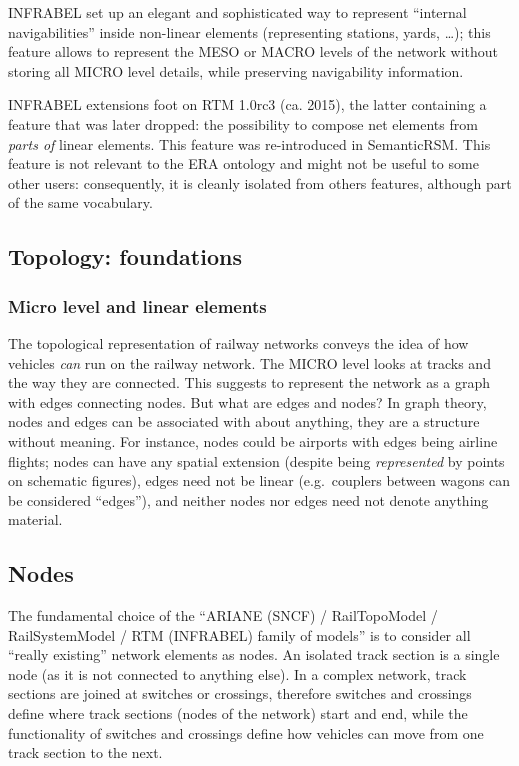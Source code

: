 \documentclass[
  11pt,
]{article}
\begin{document}
INFRABEL set up an elegant and sophisticated way to represent ``internal
navigabilities'' inside non-linear elements (representing stations,
yards, \ldots); this feature allows to represent the MESO or MACRO
levels of the network without storing all MICRO level details, while
preserving navigability information.

INFRABEL extensions foot on RTM 1.0rc3 (ca. 2015), the latter containing
a feature that was later dropped: the possibility to compose net
elements from \emph{parts of} linear elements. This feature was
re-introduced in SemanticRSM. This feature is not relevant to the ERA
ontology and might not be useful to some other users: consequently, it
is cleanly isolated from others features, although part of the same
vocabulary.

\hypertarget{topology-foundations}{%
\subsection{Topology: foundations}\label{topology-foundations}}

\hypertarget{micro-level-and-linear-elements}{%
\subsubsection{Micro level and linear
elements}\label{micro-level-and-linear-elements}}

The topological representation of railway networks conveys the idea of
how vehicles \emph{can} run on the railway network. The MICRO level
looks at tracks and the way they are connected. This suggests to
represent the network as a graph with edges connecting nodes. But what
are edges and nodes? In graph theory, nodes and edges can be associated
with about anything, they are a structure without meaning. For instance,
nodes could be airports with edges being airline flights; nodes can have
any spatial extension (despite being \emph{represented} by points on
schematic figures), edges need not be linear (e.g.~couplers between
wagons can be considered ``edges''), and neither nodes nor edges need
not denote anything material.

\hypertarget{nodes}{%
\subsection{Nodes}\label{nodes}}

The fundamental choice of the ``ARIANE (SNCF) / RailTopoModel /
RailSystemModel / RTM (INFRABEL) family of models'' is to consider all
``really existing'' network elements as nodes. An isolated track section
is a single node (as it is not connected to anything else). In a complex
network, track sections are joined at switches or crossings, therefore
switches and crossings define where track sections (nodes of the
network) start and end, while the functionality of switches and
crossings define how vehicles can move from one track section to the
next.
\end{document}
